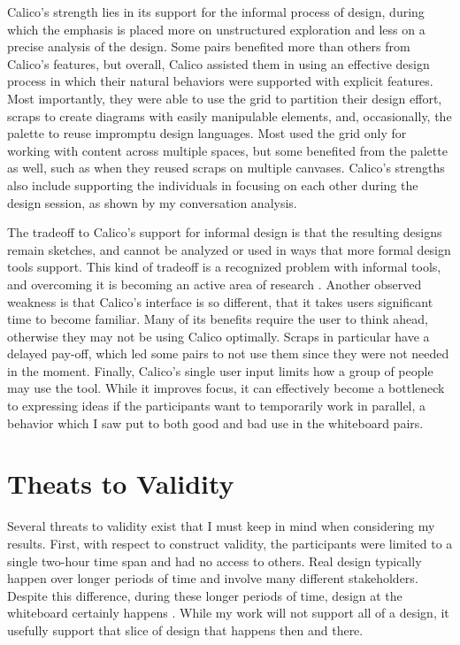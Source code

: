 \documentclass[12pt,fleqn]{ucithesis}
\begin{document}
Calico's strength lies in its support for the informal process of design, during which the emphasis is placed more on unstructured exploration and less on a precise analysis of the design. Some pairs benefited more than others from Calico's features, but overall, Calico assisted them in using an effective design process in which their natural behaviors were supported with explicit features. Most importantly, they were able to use the grid to partition their design effort, scraps to create diagrams with easily manipulable elements, and, occasionally, the palette to reuse impromptu design languages. Most used the grid only for working with content across multiple spaces, but some benefited from the palette as well, such as when they reused scraps on multiple canvases. Calico's strengths also include supporting the individuals in focusing on each other during the design session, as shown by my conversation analysis. 

The tradeoff to Calico's support for informal design is that the resulting designs remain sketches, and cannot be analyzed or used in ways that more formal design tools support. This kind of tradeoff is a recognized problem with informal tools, and overcoming it is becoming an active area of research \citep{Ossher2}. Another observed weakness is that Calico's interface is so different, that it takes users significant time to become familiar. Many of its benefits require the user to think ahead, otherwise they may not be using Calico optimally. Scraps in particular have a delayed pay-off, which led some pairs to not use them since they were not needed in the moment. Finally, Calico's single user input limits how a group of people may use the tool. While it improves focus, it can effectively become a bottleneck to expressing ideas if the participants want to temporarily work in parallel, a behavior which I saw put to both good and bad use in the whiteboard pairs.

\section{Theats to Validity}
\label{threatstovalidity}

Several threats to validity exist that I must keep in mind when considering my results. First, with respect to construct validity, the participants were limited to a single two-hour time span and had no access to others. Real design typically happen over longer periods of time and involve many different stakeholders. Despite this difference, during these longer periods of time, design at the whiteboard certainly happens \citep{cherubini2007let}. While my work will not support all of a design, it usefully support that slice of design that happens then and there.
\end{document}

